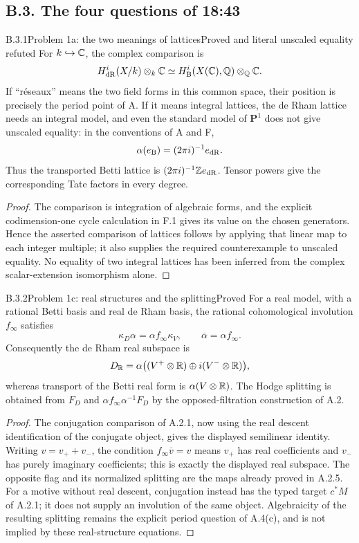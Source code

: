 \subsection{B.3. The four questions of 18:43}

\begin{result}{B.3.1}{Problem 1a: the two meanings of lattices}{Proved and literal unscaled equality refuted}
For $k\hookrightarrow\mathbb C$, the complex comparison is
\[
 H^i_{\mathrm{dR}}(X/k)\otimes_k\mathbb C
       \simeq H^i_{\mathrm B}(X(\mathbb C),\mathbb Q)\otimes_{\mathbb Q}\mathbb C.
\]
If ``r\'eseaux'' means the two field forms in this common space,
their position is precisely the period point of A. If it means
integral lattices, the de Rham lattice needs an integral model,
and even the standard model of $\mathbf P^1$ does not give
unscaled equality: in the conventions of A and F,
\[
                     \alpha(e_{\mathrm B})=(2\pi i)^{-1}e_{\mathrm{dR}}.
\]
Thus the transported Betti lattice is
$(2\pi i)^{-1}\mathbb Z e_{\mathrm{dR}}$. Tensor powers give the corresponding
Tate factors in every degree.
\end{result}
\begin{proof}
The comparison is integration of algebraic forms, and the explicit
codimension-one cycle calculation in F.1 gives its value on the
chosen generators. Hence the asserted comparison of lattices
follows by applying that linear map to each integer multiple;
it also supplies the required counterexample to unscaled equality.
No equality of two integral lattices has been inferred from the
complex scalar-extension isomorphism alone.
\end{proof}

\begin{result}{B.3.2}{Problem 1c: real structures and the splitting}{Proved}
For a real model, with a rational Betti basis and real de Rham
basis, the rational cohomological involution $f_\infty$ satisfies
\[
 \kappa_D\alpha=\alpha f_\infty\kappa_V,
 \qquad \overline\alpha=\alpha f_\infty.
\]
Consequently the de Rham real subspace is
\[
 D_{\mathbb R}=\alpha\bigl((V^+\otimes\mathbb R)\oplus
                                      i(V^-\otimes\mathbb R)\bigr),
\]
whereas transport of the Betti real form is $\alpha(V\otimes\mathbb R)$.
The Hodge splitting is obtained from $F_D$ and
$\alpha f_\infty\alpha^{-1}F_D$ by the opposed-filtration
construction of A.2.
\end{result}
\begin{proof}
The conjugation comparison of A.2.1, now using the real descent
identification of the conjugate object, gives the displayed
semilinear identity. Writing $v=v_++v_-$, the condition
$f_\infty\overline v=v$ means $v_+$ has real coefficients and
$v_-$ has purely imaginary coefficients; this is exactly the
displayed real subspace. The opposite flag and its normalized
splitting are the maps already proved in A.2.5. For a motive
without real descent, conjugation instead has the typed target
$c^*M$ of A.2.1; it does not supply an involution of the same
object. Algebraicity of the resulting splitting remains the
explicit period question of A.4(c), and is not implied by these
real-structure equations.
\end{proof}

